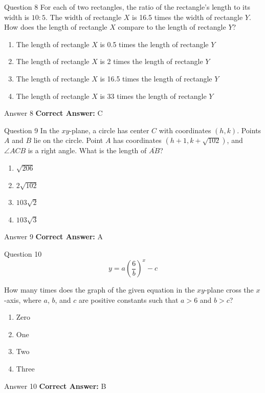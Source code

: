 \documentclass{beamer}
\begin{document}
\begin{frame}{Question 8}
\small
For each of two rectangles, the ratio of the rectangle's length to its width is \(10 : 5\).
The width of rectangle \(X\) is 16.5 times the width of rectangle \(Y\).
How does the length of rectangle \(X\) compare to the length of rectangle \(Y\)?
\vspace{0.35cm}
\begin{enumerate}
    \item[A.] The length of rectangle \(X\) is 0.5 times the length of rectangle \(Y\)
    \item[B.] The length of rectangle \(X\) is 2 times the length of rectangle \(Y\)
    \item[C.] The length of rectangle \(X\) is 16.5 times the length of rectangle \(Y\)
    \item[D.] The length of rectangle \(X\) is 33 times the length of rectangle \(Y\)
\end{enumerate}
\end{frame}
\begin{frame}{Answer 8}
\small
\textbf{Correct Answer:} C
\end{frame}

\begin{frame}{Question 9}
\small
In the \(xy\)-plane, a circle has center \(C\) with coordinates \((h, k)\).
Points \(A\) and \(B\) lie on the circle. Point \(A\) has coordinates \((h + 1, k + \sqrt{102})\),
and \(\angle ACB\) is a right angle. What is the length of \(\overline{AB}\)?
\vspace{0.35cm}
\begin{enumerate}
    \item[A.] \(\sqrt{206}\)
    \item[B.] \(2\sqrt{102}\)
    \item[C.] \(103\sqrt{2}\)
    \item[D.] \(103\sqrt{3}\)
\end{enumerate}
\end{frame}
\begin{frame}{Answer 9}
\small
\textbf{Correct Answer:} A
\end{frame}

\begin{frame}{Question 10}
\small
\[
y = a\left(\frac{6}{b}\right)^{x} - c
\]

How many times does the graph of the given equation in the \(xy\)-plane cross the \(x\)-axis,
where \(a\), \(b\), and \(c\) are positive constants such that \(a > 6\) and \(b > c\)?
\vspace{0.35cm}
\begin{enumerate}
    \item[A.] Zero
    \item[B.] One
    \item[C.] Two
    \item[D.] Three
\end{enumerate}
\end{frame}
\begin{frame}{Answer 10}
\small
\textbf{Correct Answer:} B
\end{frame}
\end{document}

